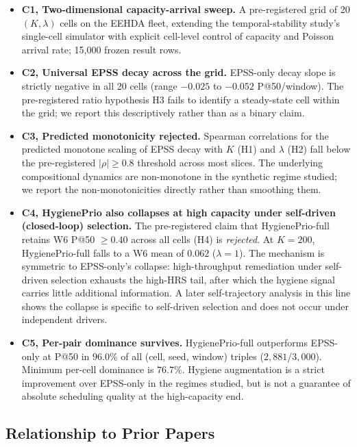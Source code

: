 \begin{itemize}
\item \textbf{C1, Two-dimensional capacity-arrival sweep.} A
pre-registered grid of 20 $(K, \lambda)$ cells on the EEHDA fleet,
extending the temporal-stability study's single-cell simulator with explicit cell-level
control of capacity and Poisson arrival rate; 15{,}000 frozen result rows.

\item \textbf{C2, Universal EPSS decay across the grid.} EPSS-only
decay slope is strictly negative in all 20 cells (range $-0.025$ to
$-0.052$ P@50/window). The pre-registered ratio hypothesis H3 fails to
identify a steady-state cell within the grid; we report this descriptively
rather than as a binary claim.

\item \textbf{C3, Predicted monotonicity rejected.} Spearman
correlations for the predicted monotone scaling of EPSS decay with $K$
(H1) and $\lambda$ (H2) fall below the pre-registered $|\rho| \geq 0.8$
threshold across most slices. The underlying compositional dynamics
are non-monotone in the synthetic regime studied; we report the
non-monotonicities directly rather than smoothing them.

\item \textbf{C4, HygienePrio also collapses at high capacity
under self-driven (closed-loop) selection.}
The pre-registered claim that HygienePrio-full retains W6 P@50
$\geq 0.40$ across all cells (H4) is \textit{rejected}. At $K = 200$,
HygienePrio-full falls to a W6 mean of $0.062$ ($\lambda = 1$). The
mechanism is symmetric to EPSS-only's collapse: high-throughput
remediation under self-driven selection exhausts the high-HRS tail,
after which the hygiene signal carries little additional information.
A later self-trajectory analysis in this line shows the collapse is specific to
self-driven selection and does not occur under independent drivers.

\item \textbf{C5, Per-pair dominance survives.} HygienePrio-full
outperforms EPSS-only at P@50 in $96.0\%$ of all (cell, seed, window)
triples ($2{,}881$/$3{,}000$). Minimum per-cell dominance is $76.7\%$.
Hygiene augmentation is a strict improvement over EPSS-only in the
regimes studied, but is not a guarantee of absolute scheduling quality
at the high-capacity end.
\end{itemize}

\subsection{Relationship to Prior Papers}

